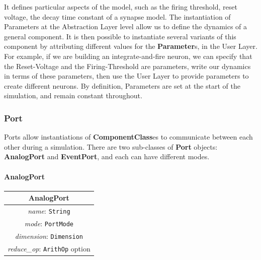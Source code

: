 \documentclass{article}
\newcommand{\nmlClass}[1]{{\bf #1}}
\newcommand{\ComponentClasses}{{\bf{ComponentClass}}es\xspace}
\newcommand{\Parameters}{{\bf{Parameter}}s\xspace}
\begin{document}
It defines particular aspects of the model, such as the firing threshold,
reset voltage, the
decay time constant of a synapse model.  The instantiation of
Parameters at the Abstraction Layer level allow us to define the
dynamics of a general component.  It is then possible to instantiate
several variants of this component by attributing different values for
the \Parameters, in the User Layer.  For example, if we are building
an integrate-and-fire neuron, we can specify that the Reset-Voltage
and the Firing-Threshold are parameters, write our dynamics in terms
of these parameters, then use the User Layer to provide parameters to
create different neurons. By definition, Parameters are set at the
start of the simulation, and remain constant throughout.


\subsubsection{Port}
\label{port}

Ports allow instantiations of \ComponentClasses to communicate between each
other during a simulation.
There are two sub-classes of \nmlClass{Port} objects: \nmlClass{AnalogPort}
and \nmlClass{EventPort}, and each can have different modes.

\paragraph{AnalogPort}


\begin{table}[htb]
\center
\begin{tabular}{|c|}
\hline
\hline
AnalogPort \\
\hline
\hline
{\em name}: {\tt String} \\
\hline
{\em mode}: {\tt PortMode} \\
\hline
{\em dimension}: {\tt Dimension} \\
\hline
{\em reduce\_op}: {\tt ArithOp} option \\
\hline
\end{tabular}
\end{table}
\end{document}
